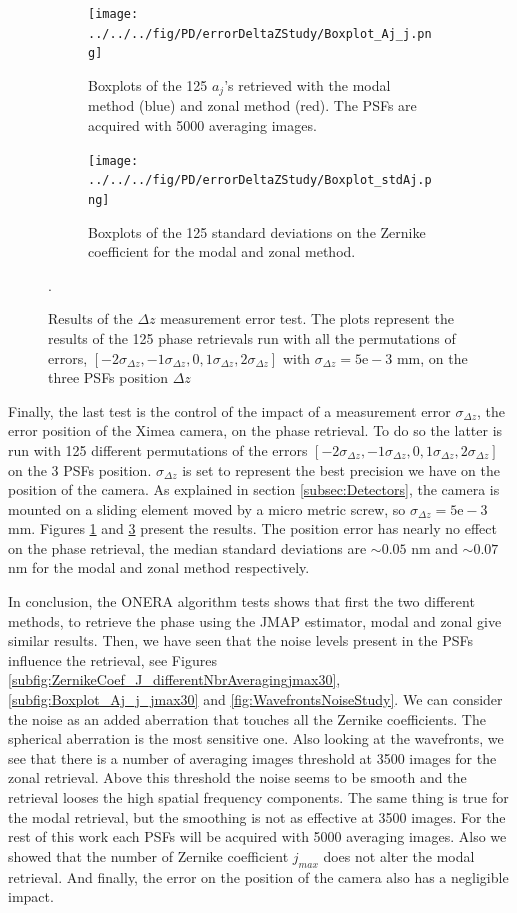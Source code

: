 \begin{figure}
\centering
    \begin{subfigure}{0.45\textwidth}
        \texttt{[image: ../../../fig/PD/errorDeltaZStudy/Boxplot\_Aj\_j.png]}
        \caption{Boxplots of the 125 $a_j$'s retrieved with the modal method (blue) and zonal method (red). The PSFs are acquired with 5000 averaging images.}
        \label{subfig:Boxplot_Aj_j}
    \end{subfigure}
    \quad
    \begin{subfigure}{0.45\textwidth}
        \texttt{[image: ../../../fig/PD/errorDeltaZStudy/Boxplot\_stdAj.png]}
        \caption{Boxplots of the 125 standard deviations on the Zernike coefficient for the modal and zonal method.}
        \label{subfig:Boxplot_stdAj}
    \end{subfigure}
    \decoRule
    \caption{Results of the $\Delta z$ measurement error test. The plots represent the results of the 125 phase retrievals run with all the permutations of errors, $[-2\sigma_{\Delta z},-1\sigma_{\Delta z},0,1\sigma_{\Delta z},2\sigma_{\Delta z}]$ with $\sigma_{\Delta z} = 5\mathrm{e}-3$ mm, on the three PSFs position $\Delta z$}.
\end{figure}

Finally, the last test is the control of the impact of a measurement error $\sigma_{\Delta z}$, the error position of the Ximea camera, on the phase retrieval. To do so the latter is run with 125 different permutations of the errors $[-2\sigma_{\Delta z},-1\sigma_{\Delta z},0,1\sigma_{\Delta z},2\sigma_{\Delta z}]$ on the 3 PSFs position. $\sigma_{\Delta z}$ is set to represent the best precision we have on the position of the camera. As explained in section \ref{subsec:Detectors}, the camera is mounted on a sliding element moved by a micro metric screw, so $\sigma_{\Delta z} = 5\mathrm{e}-3$ mm. Figures \ref{subfig:Boxplot_Aj_j} and \ref{subfig:Boxplot_stdAj} present the results. The position error has nearly no effect on the phase retrieval, the median standard deviations are $\sim0.05$ nm and $\sim0.07$ nm for the modal and zonal method respectively.

In conclusion, the ONERA algorithm tests shows that first the two different methods, to retrieve the phase using the JMAP estimator, modal and zonal give similar results. Then, we have seen that the noise levels present in the PSFs influence the retrieval, see Figures \ref{subfig:ZernikeCoef_J_differentNbrAveragingjmax30}, \ref{subfig:Boxplot_Aj_j_jmax30} and \ref{fig:WavefrontsNoiseStudy}. We can consider the noise as an added aberration that touches all the Zernike coefficients. The spherical aberration is the most sensitive one. Also looking at the wavefronts, we see that there is a number of averaging images threshold at 3500 images for the zonal retrieval. Above this threshold the noise seems to be smooth and the retrieval looses the high spatial frequency components. The same thing is true for the modal retrieval, but the smoothing is not as effective at 3500 images. For the rest of this work each PSFs will be acquired with 5000 averaging images. Also we showed that the number of Zernike coefficient $j_{max}$ does not alter the modal retrieval. And finally, the error on the position of the camera also has a negligible impact.

